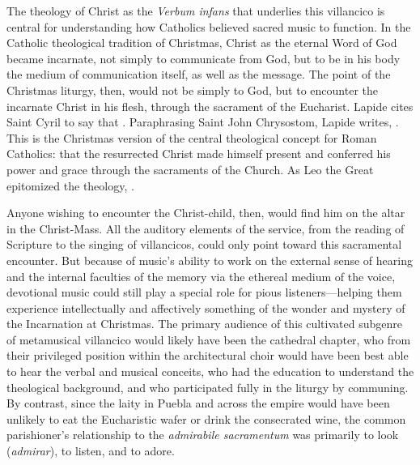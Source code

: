 The theology of Christ as the \emph{Verbum infans} that underlies this
villancico is central for understanding how Catholics believed sacred music to
function.
In the Catholic theological tradition of Christmas, Christ as the eternal Word
of God became incarnate, not simply to communicate  from God, but
to be in his body the medium of communication itself, as well as the message.
The point of the Christmas liturgy, then, would not be simply to  God, but to encounter the incarnate Christ in his flesh, through the
sacrament of the Eucharist.
Lapide cites Saint Cyril to say that .
Paraphrasing Saint John Chrysostom, Lapide writes, .%
    \Autocite[672, on ]{Lapide:Gospels19C}
This is the Christmas version of the central theological concept for Roman
Catholics: that the resurrected Christ made himself present and conferred his
power and grace through the sacraments of the Church.
As Leo the Great epitomized the theology, .%
    \Autocite[398, Sermo II de Ascensione Domini]{Leo:SermonesPL}

Anyone wishing to encounter the Christ-child, then, would find him on the altar
in the Christ-Mass.
All the auditory elements of the service, from the reading of Scripture to the
singing of villancicos, could only point toward this sacramental encounter.
But because of music's ability to work on the external sense of hearing and the
internal faculties of the memory via the ethereal medium of the voice,
devotional music could still play a special role for pious listeners---helping
them experience intellectually and affectively something of the wonder and
mystery of the Incarnation at Christmas.
The primary audience of this cultivated subgenre of metamusical villancico would
likely have been the cathedral chapter, who from their privileged position
within the architectural choir would have been best able to hear the verbal and
musical conceits, who had the education to understand the theological
background, and who participated fully in the liturgy by communing.
By contrast, since the laity in Puebla and across the empire would have
been unlikely to eat the Eucharistic wafer or drink the consecrated wine, the
common parishioner's relationship to the \emph{admirabile sacramentum} was
primarily to look (\emph{admirar}), to listen, and to adore.

